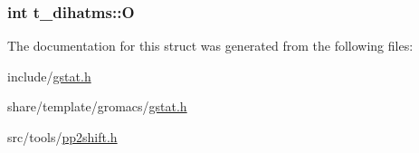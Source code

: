 \hypertarget{structt__dihatms_a3ced3c2c110da1e303ba27709f1b4ee3}{
\subsubsection[{\-O}]{\setlength{\rightskip}{0pt plus 5cm}int {\bf t\-\_\-dihatms\-::\-O}}}\label{structt__dihatms_a3ced3c2c110da1e303ba27709f1b4ee3}


\-The documentation for this struct was generated from the following files\-:\begin{DoxyCompactItemize}
\item 
include/\hyperlink{include_2gstat_8h}{gstat.\-h}\item 
share/template/gromacs/\hyperlink{share_2template_2gromacs_2gstat_8h}{gstat.\-h}\item 
src/tools/\hyperlink{pp2shift_8h}{pp2shift.\-h}\end{DoxyCompactItemize}

